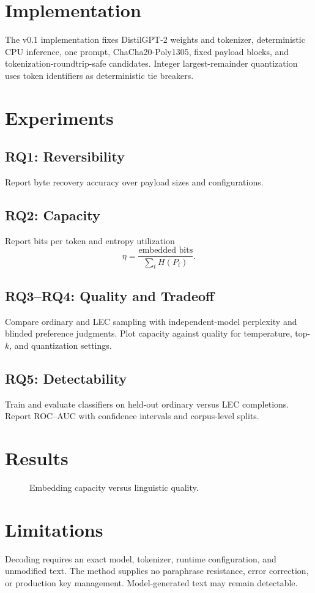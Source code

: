 \documentclass[10pt]{article}
\begin{document}
\section{Implementation}
The v0.1 implementation fixes DistilGPT-2 weights and tokenizer, deterministic
CPU inference, one prompt, ChaCha20-Poly1305, fixed payload blocks, and
tokenization-roundtrip-safe candidates. Integer largest-remainder quantization
uses token identifiers as deterministic tie breakers.

\section{Experiments}
\subsection{RQ1: Reversibility}
Report byte recovery accuracy over payload sizes and configurations.
\subsection{RQ2: Capacity}
Report bits per token and entropy utilization
\[
  \eta=\frac{\text{embedded bits}}{\sum_t H(P_t)}.
\]
\subsection{RQ3--RQ4: Quality and Tradeoff}
Compare ordinary and LEC sampling with independent-model perplexity and blinded
preference judgments. Plot capacity against quality for temperature, top-$k$,
and quantization settings.
\subsection{RQ5: Detectability}
Train and evaluate classifiers on held-out ordinary versus LEC completions.
Report ROC--AUC with confidence intervals and corpus-level splits.

\section{Results}
\begin{figure}[h]
  \centering
  \caption{Embedding capacity versus linguistic quality.}
\end{figure}

\section{Limitations}
Decoding requires an exact model, tokenizer, runtime configuration, and
unmodified text. The method supplies no paraphrase resistance, error correction,
or production key management. Model-generated text may remain detectable.
\end{document}
